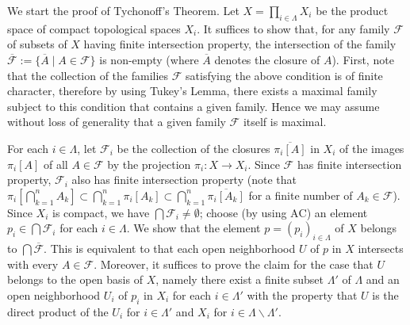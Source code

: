 \documentclass{article}
\begin{document}
We start the proof of Tychonoff's Theorem.
Let $X = \prod_{i \in \Lambda} X_i$ be the product space of compact topological spaces $X_i$.
It suffices to show that, for any family $\mathcal{F}$ of subsets of $X$ having finite intersection property, the intersection of the family $\overline{\mathcal{F}} := \{\overline{A} \mid A \in \mathcal{F}\}$ is non-empty (where $\overline{A}$ denotes the closure of $A$).
First, note that the collection of the families $\mathcal{F}$ satisfying the above condition is of finite character, therefore by using Tukey's Lemma, there exists a maximal family subject to this condition that contains a given family.
Hence we may assume without loss of generality that a given family $\mathcal{F}$ itself is maximal.

For each $i \in \Lambda$, let $\mathcal{F}_i$ be the collection of the closures $\overline{\pi_i[A]}$ in $X_i$ of the images $\pi_i[A]$ of all $A \in \mathcal{F}$ by the projection $\pi_i \colon X \to X_i$.
Since $\mathcal{F}$ has finite intersection property, $\mathcal{F}_i$ also has finite intersection property (note that $\pi_i[\bigcap_{k=1}^{n} A_k] \subset \bigcap_{k=1}^{n} \pi_i[A_k] \subset \bigcap_{k=1}^{n} \overline{\pi_i[A_k]}$ for a finite number of $A_k \in \mathcal{F}$).
Since $X_i$ is compact, we have $\bigcap \mathcal{F}_i \neq \emptyset$; choose (by using $\mathrm{AC}$) an element $p_i \in \bigcap \mathcal{F}_i$ for each $i \in \Lambda$.
We show that the element $p = (p_i)_{i \in \Lambda}$ of $X$ belongs to $\bigcap \overline{\mathcal{F}}$.
This is equivalent to that each open neighborhood $U$ of $p$ in $X$ intersects with every $A \in \mathcal{F}$.
Moreover, it suffices to prove the claim for the case that $U$ belongs to the open basis of $X$, namely there exist a finite subset $\Lambda'$ of $\Lambda$ and an open neighborhood $U_i$ of $p_i$ in $X_i$ for each $i \in \Lambda'$ with the property that $U$ is the direct product of the $U_i$ for $i \in \Lambda'$ and $X_i$ for $i \in \Lambda \smallsetminus \Lambda'$.
\end{document}
